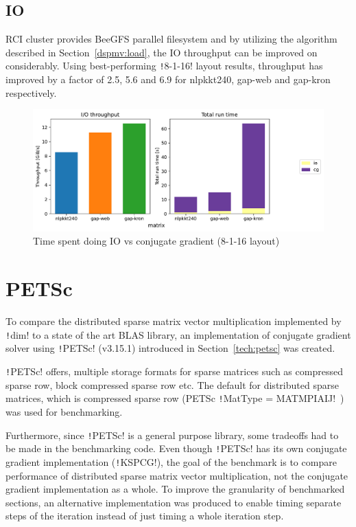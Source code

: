 \documentclass[thesis=M,english]{FITthesis}[2019/12/23]
\newcommand{\csre}[1]{\texttt!#1!}
\begin{document}
\subsection{IO}

RCI cluster provides BeeGFS parallel filesystem and by utilizing the algorithm described in
Section~\ref{dspmv:load}, the IO throughput can be improved on considerably. Using best-performing \csre{8-1-16}
layout results, throughput has improved by a factor of 2.5, 5.6 and 6.9 for nlpkkt240, gap-web
and gap-kron respectively.

\begin{figure}[htp]
    \centering
    \includegraphics[scale=0.5]{static/io_mp.pdf}
    \caption{Time spent doing IO vs conjugate gradient (8-1-16 layout)}
\end{figure}

\section{PETSc}

To compare the distributed sparse matrix vector multiplication implemented by \csre{dim}
to a state of the art BLAS library, an
implementation of conjugate gradient solver using \csre{PETSc} (v3.15.1) introduced in
Section~\ref{tech:petsc} was created.

\csre{PETSc} offers,
multiple storage formats for sparse matrices such as compressed sparse row, block compressed
sparse row etc. The default for distributed sparse matrices, which is compressed sparse row
(PETSc \csre{MatType = MATMPIAIJ}~\cite{petsc-user-ref}) was used for benchmarking.

Furthermore, since \csre{PETSc} is a general purpose library, some tradeoffs had to be made
in the benchmarking code. Even though \csre{PETSc} has its own conjugate gradient implementation
(\csre{KSPCG}),
the goal of the benchmark is to compare performance of distributed sparse matrix vector
multiplication, not the conjugate gradient implementation as a whole. To improve the granularity
of benchmarked sections, an alternative
implementation was produced to enable timing separate steps of the iteration instead of just
timing a whole iteration step.
\end{document}
